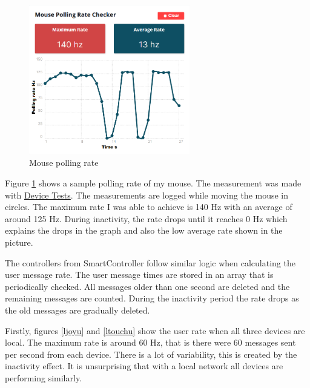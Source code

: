 \documentclass{l4proj}
\begin{document}
\begin{figure}[h!]
    \centering
    \includegraphics[width=7cm]{./images/mouse.png}
    \caption{Mouse polling rate}
    \label{fig:pollrate}
\end{figure}

Figure \ref{fig:pollrate} shows a sample polling rate of my mouse. The measurement was made with \href{https://devicetests.com/mouse-rate-test}{Device Tests}. The measurements are logged while moving the mouse in circles. The maximum rate I was able to achieve is 140 Hz with an average of around 125 Hz. During inactivity, the rate drops until it reaches 0 Hz which explains the drops in the graph and also the low average rate shown in the picture. \par

The controllers from SmartController follow similar logic when calculating the user message rate. The user message times are stored in an array that is periodically checked. All messages older than one second are deleted and the remaining messages are counted. During the inactivity period the rate drops as the old messages are gradually deleted. \par

Firstly, figures \ref{ljoyu} and \ref{ltouchu} show the user rate when all three devices are local. The maximum rate is around 60 Hz, that is there were 60 messages sent per second from each device. There is a lot of variability, this is created by the inactivity effect. It is unsurprising that with a local network all devices are performing similarly.  
\end{document}

